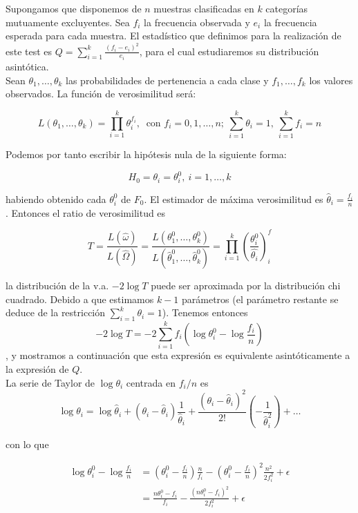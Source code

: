	Supongamos que disponemos de $n$ muestras clasificadas en $k$ categorías mutuamente excluyentes. Sea $f_i$ la frecuencia observada y $e_i$ la frecuencia esperada para cada muestra. El estadístico que definimos para la realización de este test es $Q = \sum\limits_{i=1}^k \frac{(f_i-e_i)^2}{e_i}$, para el cual estudiaremos su distribución asintótica.\\
	
	Sean $\theta_1, \dots, \theta_k$ las probabilidades de pertenencia a cada clase y $f_1, \dots, f_k$ los valores observados. La función de verosimilitud será:
	
	\[ L(\theta_1, \dots, \theta_k) = 
			\prod\limits_{i=1}^k \theta_i^{f_i},\			
	   \text{ con } f_i = 0, 1, \dots, n; \
	   \sum\limits_{i=1}^k \theta_i = 1, \
	   \sum\limits_{i=1}^k f_i = n
	 \]
	 
	 Podemos por tanto escribir la hipótesis nula de la siguiente forma:
	 
	 \[ H_0 = \theta_i = \theta_i^0,\ i = 1, \dots, k \]
	 
	 habiendo obtenido cada $\theta_i^0$ de $F_0$. El estimador de máxima verosimilitud es $\hat{\theta}_i = \frac{f_i}{n}$. Entonces el ratio de verosimilitud es
	 
	 \[ 
	 T = \frac{L(\hat{\omega})}{L(\hat{\Omega})}
	   = \frac{L(\theta_1^0, \dots, \theta_k^0)}
	   		{L(\hat{\theta}_1^0, \dots, \hat{\theta}_k^0)}
	   = \prod\limits_{i=1}^k
	   		\left( 
	 			\frac{\theta_i^0}{\hat{\theta_i}} 
	 		\right)^f_i
	 \]
	 
	 la distribución de la v.a. $-2 \log T$ puede ser aproximada por la distribución chi cuadrado. Debido a que estimamos $k-1$ parámetros (el parámetro restante se deduce de la restricción $\sum\limits_{i=1}^k \theta_i = 1$). Tenemos entonces
	 \[ -2 \log T = 
	 		-2 \sum\limits_{i=1}^k
	 			f_i \left(
	 					\log \theta_i^0 - \log \frac{f_i}{n}
	 				\right)
	 \]
	, y mostramos a continuación que esta expresión es equivalente asintóticamente a la expresión de $Q$.\\
	
	La serie de Taylor de $\log \theta_i$ centrada en $f_i/n$ es
	\[ \log \theta_i = 
			\log \hat{\theta}_i +
			(\theta_i - \hat{\theta}_i)
				\frac{1}{\hat{\theta}_i} +
			\frac{(\theta_i - \hat{\theta}_i)^2}{2!}
				\left(-\frac{1}{\hat{\theta}_i^2}\right) +
			\dots
	\]
	
	con lo que
	
	\begin{align*}	
	 \log \theta_i^0 - \log \frac{f_i}{n} & = 
			\left(
				\theta_i^0 - \frac{f_i}{n}
			\right) \frac{n}{f_i} -
			\left(
				\theta_i^0 - \frac{f_i}{n}
			\right)^2 \frac{n^2}{2f_i^2} + \epsilon \\
		&= \frac{n\theta_i^0 - f_i}{f_i} -
			\frac{(n\theta_i^0 - f_i)^2}{2f_i^2} +\epsilon
	\end{align*}
	
